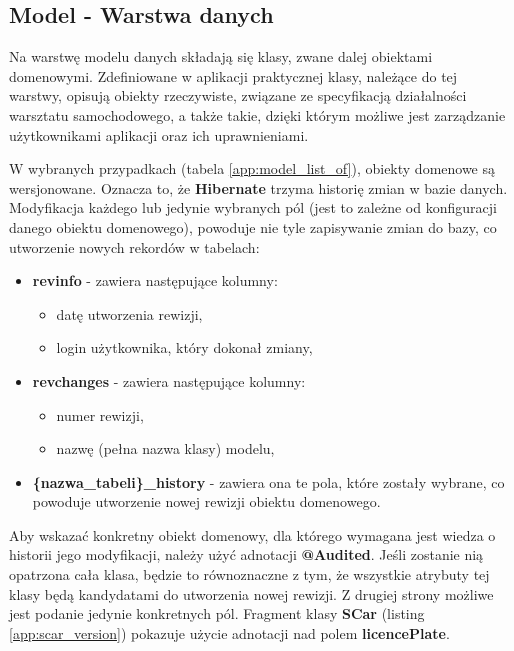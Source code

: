\subsection{Model - Warstwa danych}
		Na warstwę modelu danych składają się klasy, zwane dalej obiektami domenowymi. Zdefiniowane w aplikacji praktycznej klasy, należące do tej warstwy, opisują obiekty rzeczywiste, związane ze specyfikacją działalności warsztatu samochodowego, a także takie, dzięki którym możliwe jest zarządzanie użytkownikami aplikacji oraz ich uprawnieniami. 
		
		W wybranych przypadkach (tabela \ref{app:model_list_of}), obiekty domenowe są wersjonowane. Oznacza to, że \textbf{Hibernate} trzyma historię zmian w bazie danych. Modyfikacja każdego lub jedynie wybranych pól (jest to zależne od konfiguracji danego obiektu domenowego), powoduje nie tyle zapisywanie zmian do bazy, co utworzenie nowych rekordów w tabelach:
	\begin{itemize}
		\item \textbf{revinfo} - zawiera następujące kolumny:
		\begin{itemize}
			\item datę utworzenia rewizji,
			\item login użytkownika, który dokonał zmiany,
		\end{itemize} 
		\item \textbf{revchanges} - zawiera następujące kolumny:
		\begin{itemize}
			\item numer rewizji,
			\item nazwę (pełna nazwa klasy) modelu,
		\end{itemize}
		\item \textbf{\{nazwa\_tabeli\}\_history} - zawiera ona te pola, które zostały wybrane, co powoduje utworzenie nowej rewizji obiektu domenowego.
	\end{itemize}
	
	Aby wskazać konkretny obiekt domenowy, dla którego wymagana jest wiedza o historii jego modyfikacji, należy użyć adnotacji \textbf{@Audited}. Jeśli zostanie nią opatrzona cała klasa, będzie to równoznaczne z tym, że wszystkie atrybuty tej klasy będą kandydatami do utworzenia nowej rewizji. Z drugiej strony możliwe jest podanie jedynie konkretnych pól. Fragment klasy \textbf{SCar} (listing \ref{app:scar_version}) pokazuje użycie adnotacji nad polem \textbf{licencePlate}. 
	
